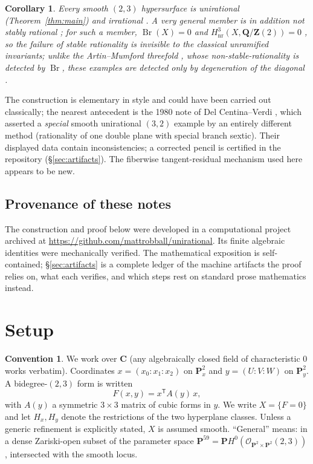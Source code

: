 \documentclass[11pt]{amsart}
\newtheorem{corollary}[theorem]{Corollary}
\theoremstyle{definition}
\newtheorem{convention}[theorem]{Convention}
\theoremstyle{remark}
\newcommand{\PP}{\mathbf{P}}
\newcommand{\CC}{\mathbf{C}}
\newcommand{\ZZ}{\mathbf{Z}}
\newcommand{\QQ}{\mathbf{Q}}
\newcommand{\Br}{\operatorname{Br}}
\newcommand{\Hx}{H_x}
\newcommand{\Hy}{H_y}
\newcommand{\repo}{\url{https://github.com/mattrobball/unirational}}
\begin{document}
\begin{corollary}\label{cor:invisible}
Every smooth $(2,3)$ hypersurface is unirational
{\rm(Theorem~\ref{thm:main})} and irrational
{\rm\cite[Th\'eor\`eme~4.9]{Beauville}}.  A very general member is in
addition not stably rational {\rm\cite[Theorem~1.1]{BvB}}; for such a member,
$\Br(X)=0$ and
$H^3_{\mathrm{nr}}(X,\QQ/\ZZ(2))=0$ {\rm\cite{CTV}}, so the failure of
stable rationality is invisible to the classical unramified invariants;
unlike the Artin--Mumford threefold {\rm\cite{ArtinMumford}}, whose
non-stable-rationality is detected by $\Br$, these examples are detected
only by degeneration of the diagonal {\rm\cite{BvB}}.
\end{corollary}

The construction is elementary in style and could have been carried out
classically; the nearest antecedent is the 1980 note of Del Centina--Verdi
\cite{DCV}, which asserted a \emph{special} smooth unirational $(3,2)$
example by an entirely different method (rationality of one double plane
with special branch sextic).  Their displayed data contain
inconsistencies; a corrected pencil is certified in the repository
(\S\ref{sec:artifacts}).  The fiberwise tangent-residual mechanism used
here appears to be new.

\subsection*{Provenance of these notes}
The construction and proof below were developed in a computational project
archived at \repo.  Its finite algebraic identities were mechanically
verified.  The mathematical exposition is self-contained;
\S\ref{sec:artifacts} is a complete ledger of the machine artifacts the proof
relies on, what each verifies, and which steps rest on standard prose
mathematics instead.

\section{Setup}\label{sec:setup}

\begin{convention}
We work over $\CC$ (any algebraically closed field of characteristic $0$
works verbatim).  Coordinates $x=(x_0{:}x_1{:}x_2)$ on $\PP^2_x$ and
$y=(U{:}V{:}W)$ on $\PP^2_y$.  A bidegree-$(2,3)$ form is written
\[
F(x,y)=x^{\mathsf T}A(y)\,x,
\]
with $A(y)$ a symmetric $3\times3$ matrix of cubic forms in $y$.  We write
$X=\{F=0\}$ and let $\Hx,\Hy$ denote the restrictions of the two hyperplane
classes.  Unless a generic refinement is explicitly stated, $X$ is assumed
smooth.  ``General'' means: in a dense Zariski-open subset of the
parameter space $\PP^{59}=\PP H^0(\mathcal O_{\PP^2\times\PP^2}(2,3))$,
intersected with the smooth locus.
\end{convention}
\end{document}
